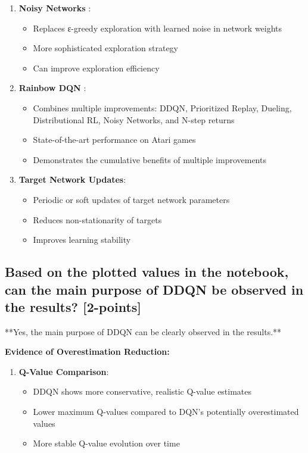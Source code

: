 \documentclass[12pt]{article}
\begin{document}
{{{\begin{enumerate}
    \item \textbf{Noisy Networks} \cite{fortunato2017noisy}:
    \begin{itemize}
        \item Replaces ε-greedy exploration with learned noise in network weights
        \item More sophisticated exploration strategy
        \item Can improve exploration efficiency
    \end{itemize}
    
    \item \textbf{Rainbow DQN} \cite{hessel2018rainbow}:
    \begin{itemize}
        \item Combines multiple improvements: DDQN, Prioritized Replay, Dueling, Distributional RL, Noisy Networks, and N-step returns
        \item State-of-the-art performance on Atari games
        \item Demonstrates the cumulative benefits of multiple improvements
    \end{itemize}
    
    \item \textbf{Target Network Updates}:
    \begin{itemize}
        \item Periodic or soft updates of target network parameters
        \item Reduces non-stationarity of targets
        \item Improves learning stability
    \end{itemize}
\end{enumerate}

\subsection{Based on the plotted values in the notebook, can the main purpose of DDQN be observed in the results? [2-points]}

**Yes, the main purpose of DDQN can be clearly observed in the results.**

\textbf{Evidence of Overestimation Reduction:}

\begin{enumerate}
    \item \textbf{Q-Value Comparison}:
    \begin{itemize}
        \item DDQN shows more conservative, realistic Q-value estimates
        \item Lower maximum Q-values compared to DQN's potentially overestimated values
        \item More stable Q-value evolution over time
    \end{itemize}
    

\end{enumerate}}}}
\end{document}
